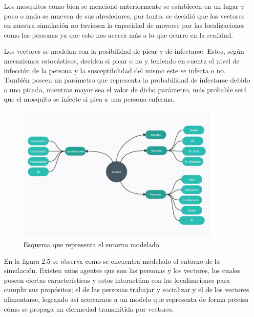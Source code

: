 Los mosquitos como bien se mencionó anteriormente se establecen en un lugar y poco o nada se mueven de 
sus alrededores, por tanto, se decidió que los vectores en nuestra simulación no tuviesen la capacidad de moverse por
las localizaciones como las personas ya que esto nos acerca más a lo que ocurre en la realidad.

Los vectores se modelan con la posibilidad de picar y de infectarse. Estos, según mecanismos estocásticos,
deciden si picar o no y teniendo en cuenta el nivel de infección de la persona y la susceptibilidad del mismo este
se infecta o no. También poseen un parámetro que representa la probabilidad de infectarse debido a una picada, mientras
mayor sea el valor de dicho parámetro, más probable será que el mosquito se infecte si pica a una persona enferma.

\begin{figure}[htb]
    \centering
    \includegraphics[width=0.9\textwidth]{Graphics/Pers_Loc_Vec.png}
    \caption{Esquema que representa el entorno modelado.}
\end{figure}
En la figura 2.5 se observa como se encuentra modelado el entorno de la simulación. Existen unos agentes que son las
personas y los vectores, los cuales poseen ciertas características y estos interactúan con las localizaciones para
cumplir sus propósitos; el de las personas trabajar y socializar y el de los vectores alimentarse, logrando así
acercarnos a un modelo que representa de forma precisa cómo se propaga un efermedad transmitida por vectores.

